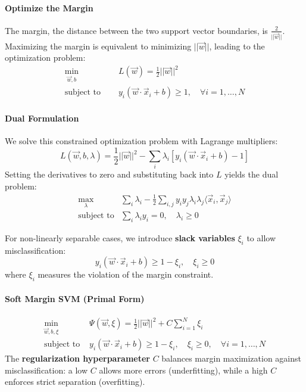 \paragraph{Optimize the Margin}
The margin, the distance between the two support vector boundaries, is $\frac{2}{||\vec{w}||}$.
Maximizing the margin is equivalent to minimizing $||\vec{w}||$, leading to the optimization problem:
\begin{align}
\min_{\vec{w}, b} \quad &L(\vec{w}) = \frac{1}{2} ||\vec{w}||^2\\
    \text{subject to } \quad&
y_i (\vec{w} \cdot \vec{x}_i + b) \geq 1, \quad \forall i = 1, \dots, N    
\end{align}

\paragraph{Dual Formulation}
We solve this constrained optimization problem with Lagrange multipliers:
\begin{equation}
L(\vec{w}, b, \lambda) = \frac{1}{2} ||\vec{w}||^2 - \sum_{i} \lambda_i [y_i (\vec{w} \cdot \vec{x}_i + b) - 1]    
\end{equation}
Setting the derivatives to zero and substituting back into $L$ yields the dual problem:
\begin{align}
\max_{\lambda} &\sum_i \lambda_i - \frac{1}{2} \sum_{i,j} y_i y_j \lambda_i \lambda_j \langle \vec{x}_i, \vec{x}_j \rangle\\
\text{subject to}& \sum_i \lambda_i y_i = 0, \quad \lambda_i \geq 0
\end{align}    

For non-linearly separable cases, we introduce \textbf{slack variables} $\xi_i$ to allow misclassification:
\begin{equation}
y_i (\vec{w} \cdot \vec{x}_i + b) \geq 1 - \xi_i, \quad \xi_i \geq 0    
\end{equation}
where $\xi_i$ measures the violation of the margin constraint.
\paragraph{Soft Margin SVM (Primal Form)}
\begin{align*}
\min_{\vec{w}, b, \xi} & \Psi(\vec{w}, \xi) = \frac{1}{2} ||\vec{w}||^2 + C \sum_{i=1}^N \xi_i\\
\text{subject to } & y_i (\vec{w} \cdot \vec{x}_i + b) \geq 1 - \xi_i, \quad \xi_i \geq 0, \quad \forall i = 1, \dots, N
\end{align*}
The \textbf{regularization hyperparameter} $C$ balances margin maximization against misclassification: a low $C$ allows more errors (underfitting), while a high $C$ enforces strict separation (overfitting).

